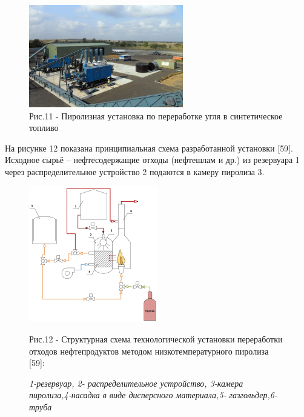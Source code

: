 \begin{figure}[H]
	\centering
	\includegraphics[width=0.6\textwidth]{media/chem2/image74}
	\caption*{Рис.11 - Пиролизная установка по переработке угля в
синтетическое топливо}
\end{figure}

На рисунке 12 показана принципиальная схема разработанной установки
{[}59{]}. Исходное сырьё -- нефтесодержащие отходы (нефтешлам и др.) из
резервуара 1 через распределительное устройство 2 подаются в камеру
пиролиза 3.

\begin{figure}[H]
	\centering
	\includegraphics[width=0.5\textwidth]{media/chem2/image75}
	\caption*{Рис.12 - Структурная схема технологической установки
переработки отходов нефтепродуктов методом низкотемпературного пиролиза
{[}59{]}:}
    \caption*{\normalfont\emph{1-резервуар, 2- распределительное устройство, 3-камера пиролиза,4-насадка в виде дисперсного материала,5- газгольдер,6-труба}}
\end{figure}

